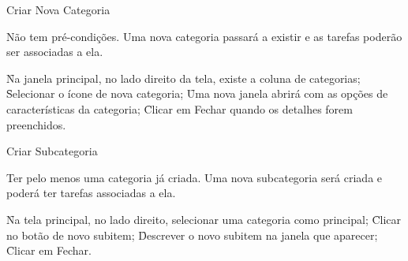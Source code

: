 \begin{funcionalidade}{Criar Nova Categoria}



	\condicao
	{Não tem pré-condições.} %
	{Uma nova categoria passará a existir e as tarefas poderão ser associadas a ela.} %

	\begin{fluxo}
		\f Na janela principal, no lado direito da tela, existe a coluna de categorias;
		\f Selecionar o ícone de nova categoria;
		\f Uma nova janela abrirá com as opções de características da categoria;
		\f Clicar em Fechar quando os detalhes forem preenchidos.
	\end{fluxo}

\end{funcionalidade}


\begin{funcionalidade}{Criar Subcategoria}



	\condicao
	{Ter pelo menos uma categoria já criada.} %
	{Uma nova subcategoria será criada e poderá ter tarefas associadas a ela.} %

	\begin{fluxo}
		\f Na tela principal, no lado direito, selecionar uma categoria como principal;
		\f Clicar no botão de novo subitem;
		\f Descrever o novo subitem na janela que aparecer;
		\f Clicar em Fechar.
	\end{fluxo}


\end{funcionalidade}

